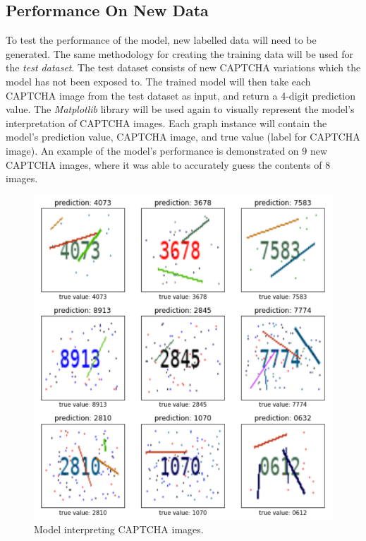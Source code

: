 \documentclass[11pt,conference]{IEEEtran}
\begin{document}
\subsection{Performance On New Data}
To test the performance of the model, new labelled data will need to be
generated. The same methodology for creating the training data will be used for
the \emph{test dataset}. The test dataset consists of new CAPTCHA variations
which the model has not been exposed to. The trained model will then
take each CAPTCHA image from the test dataset as input, and return a
4-digit prediction value. The \emph{Matplotlib} library will be used again to
visually represent the model's interpretation of CAPTCHA images. Each graph
instance will contain the model's prediction value, CAPTCHA image, and true
value (label for CAPTCHA image). An example of the model's performance is
demonstrated on 9 new CAPTCHA images, where it was able to accurately guess the
contents of 8 images.

\begin{figure}[htbp]
	\centerline{\includegraphics[scale=0.35]{images/prediction-results.png}}
	\caption{Model interpreting CAPTCHA images.}
	\label{figure}
\end{figure}
\end{document}
